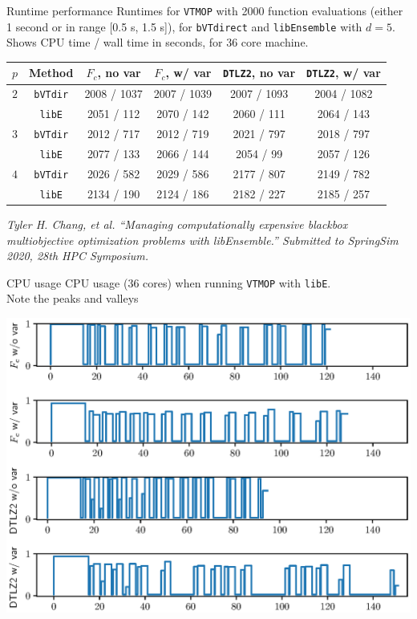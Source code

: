 \documentclass[xcolor=dvipsnames]{beamer}
\begin{document}
\begin{frame}{Runtime performance}
Runtimes for {\tt VTMOP} with 2000 function evaluations (either 1 second or
in range [0.5 s, 1.5 s]), for {\tt bVTdirect} and {\tt libEnsemble}
with $d=5$. Shows CPU time / wall time in seconds, for 36 core machine.\\
\bigskip
\begin{center}
{\tiny
\begin{tabular}{cc|cccc}
$p$ & Method & $F_c$, no var & $F_c$, w/ var & {\tt DTLZ2}, no var
& {\tt DTLZ2}, w/ var\\
\hline
$2$ & {\tt bVTdir} & 2008 / 1037 & 2007 / 1039 & 2007 / 1093 & 2004 / 1082\\
& {\tt libE} & 2051 / 112 & 2070 / 142 & 2060 / 111 & 2064 / 143\\
\hline
 $3$ & {\tt bVTdir} & 2012 / 717 & 2012 / 719 & 2021 / 797 & 2018 / 797\\
& {\tt libE} & 2077 / 133 & 2066 / 144 & 2054 / 99 & 2057 / 126\\
\hline
$4$ &{\tt bVTdir} & 2026 / 582 & 2029 / 586 & 2177 / 807 & 2149 / 782\\
&{\tt libE} & 2134 / 190 & 2124 / 186 & 2182 / 227 & 2185 / 257\\
\end{tabular}
}
\end{center}
\bigskip
{\it \small
Tyler H. Chang, et al.
``Managing computationally expensive blackbox multiobjective optimization
problems with libEnsemble.''
Submitted to SpringSim 2020, 28th HPC Symposium.
}
\end{frame}
\begin{frame}{CPU usage}
CPU usage (36 cores) when running {\tt VTMOP} with {\tt libE}.\\
\smallskip
Note the peaks and valleys
\begin{center}
\includegraphics[width=.7\textwidth]{cpu_plot.eps}
\end{center}
\end{frame}
\end{document}
